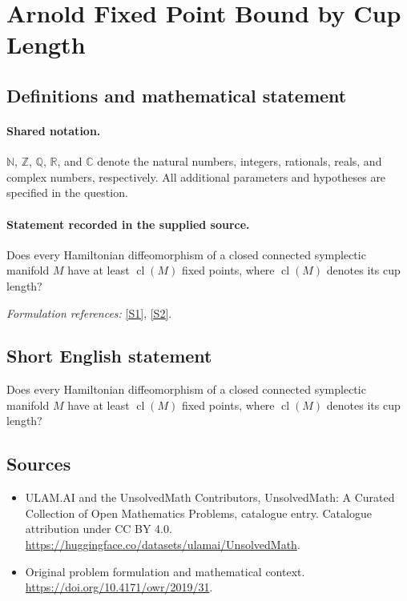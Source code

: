 \documentclass[11pt]{article}
\newcommand{\sref}[2]{\hyperlink{source:#1:#2}{[S#2]}}
\begin{document}
\section{Arnold Fixed Point Bound by Cup Length}\label{statement}

\subsection{Definitions and mathematical statement}

\paragraph{Shared notation.}$\mathbb N$, $\mathbb Z$, $\mathbb Q$, $\mathbb R$, and $\mathbb C$ denote the natural numbers, integers, rationals, reals, and complex numbers, respectively. All additional parameters and hypotheses are specified in the question.


\paragraph{Statement recorded in the supplied source.}
Does every Hamiltonian diffeomorphism of a closed connected symplectic manifold $M$ have at least $\operatorname{cl}(M)$ fixed points, where $\operatorname{cl}(M)$ denotes its cup length?
\par\smallskip\textit{Formulation references:} \sref{statement}{1}, \sref{statement}{2}.
\subsection{Short English statement}
Does every Hamiltonian diffeomorphism of a closed connected symplectic manifold $M$ have at least $\operatorname{cl}(M)$ fixed points, where $\operatorname{cl}(M)$ denotes its cup length?
\subsection{Sources}
\begin{itemize}
\item[\hypertarget{source:statement:1}{S1}] ULAM.AI and the UnsolvedMath Contributors, UnsolvedMath: A Curated Collection of Open Mathematics Problems, catalogue entry. Catalogue attribution under CC BY 4.0.
\url{https://huggingface.co/datasets/ulamai/UnsolvedMath}.
\item[\hypertarget{source:statement:2}{S2}] Original problem formulation and mathematical context.
\url{https://doi.org/10.4171/owr/2019/31}.
\end{itemize}
\label{end:statement}
\end{document}
